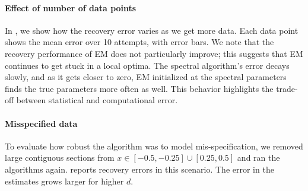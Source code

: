\paragraph{Effect of number of data points}

In , we show how the recovery error varies as we get
more data. Each data point shows the mean error over 10 attempts, with
error bars. We note that the recovery performance of EM does not
particularly improve; this suggests that EM continues to get stuck in
a local optima. The spectral algorithm's error decays slowly, and as it
gets closer to zero, EM initialized at the spectral parameters finds the
true parameters more often as well. This behavior highlights the
trade-off between statistical and computational error. 

\paragraph{Misspecified data}

To evaluate how robust the algorithm was to model mis-specification, we
removed large contiguous sections from $x \in [-0.5,-0.25] \cup
[0.25,0.5]$ and ran the algorithms again.
 reports recovery errors in this
scenario. The error in the estimates grows larger for higher $d$.

